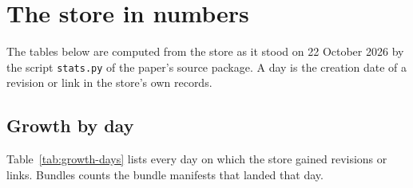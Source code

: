 \section{The store in numbers}\label{app:tables}

The tables below are computed from the store as it stood on 22 October 2026 by the script \texttt{stats.py} of the paper's source package. A day is the creation date of a revision or link in the store's own records.

\subsection*{Growth by day}
Table~\ref{tab:growth-days} lists every day on which the store gained revisions or links. Bundles counts the bundle manifests that landed that day.

